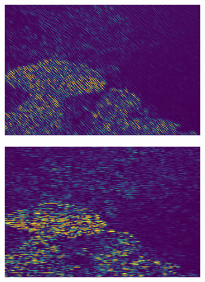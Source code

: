\begin{figure}[h!]
\begin{subfigure}[t]{0.32\textwidth}
		\subcaption{}
	\end{subfigure}
	\hfill
	\begin{subfigure}[t]{0.32\textwidth}
		\centering
		\includegraphics[width=\textwidth,keepaspectratio]{images/gen/GEN_tsugf_filterbank_101027_2.png}
		\subcaption{}
	\end{subfigure}
	\hfill
	\begin{subfigure}[t]{0.32\textwidth}
		\centering
		\includegraphics[width=\textwidth,keepaspectratio]{images/gen/GEN_tsugf_filterbank_101027_3.png}
		\subcaption{}
	\end{subfigure}
	\hfill
	\begin{subfigure}[t]{0.32\textwidth}
		\centering

\end{subfigure}
\end{figure}
